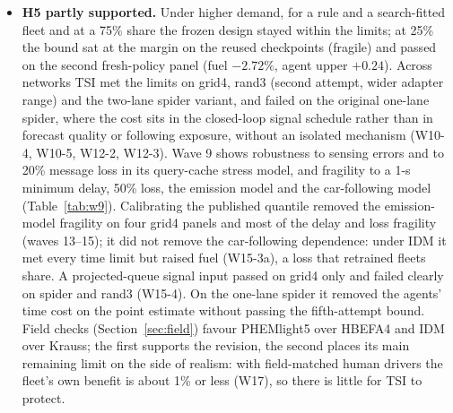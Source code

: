 \begin{itemize}
the F1-B fleets of a fourth, newly trained panel ($\alpha=0.05$), and an uncertainty-aware selection rule with a state-dependent quantile
lowered fuel and agents' time loss against the wave-13 rule (W15-2); refitting the network on its own published logs added fuel but missed the
time margin at the third-attempt level. Against the corrected task-specific DC-Ada port at matched light-side simulation budget TSI has lower time losses but no
resolved fuel difference; that port fails the time limits, also when given TSI's speed information, the full horizon and up to eight times the budget. The
task-specific FoRL port, which retrains the signal, fails the limits, also with the authors' reward scale.
\item \textbf{H5 partly supported.} Under higher demand, for a rule and a search-fitted fleet and at a 75\% share the frozen design stayed
within the limits; at 25\% the bound sat at the margin on the reused checkpoints (fragile) and passed on the second fresh-policy panel
(fuel $-2.72\%$, agent upper $+0.24$). Across networks TSI met the limits on grid4, rand3 (second attempt, wider adapter range) and the
two-lane spider variant, and failed on the original one-lane spider, where the cost sits in the closed-loop signal schedule rather than in forecast quality or following exposure, without an isolated
mechanism (W10-4, W10-5, W12-2, W12-3). Wave 9 shows
robustness to sensing errors and to 20\% message loss in its query-cache stress model, and fragility to a 1-s minimum delay, 50\% loss,
the emission model and the car-following model (Table~\ref{tab:w9}). Calibrating the published quantile removed the emission-model
fragility on four grid4 panels and most of the delay and loss fragility (waves 13--15); it did not remove the car-following dependence:
under IDM it met every time limit but raised fuel (W15-3a), a loss that retrained fleets share. A projected-queue signal input passed on
grid4 only and failed clearly on spider and rand3 (W15-4). On the one-lane spider it removed the agents' time cost on the point estimate without passing the
fifth-attempt bound. Field checks (Section~\ref{sec:field}) favour PHEMlight5 over HBEFA4 and IDM over Krauss; the first supports the revision,
the second places its main remaining limit on the side of realism: with field-matched human drivers the fleet's own benefit is about 1\%
or less (W17), so there is little for TSI to protect.
\end{itemize}

